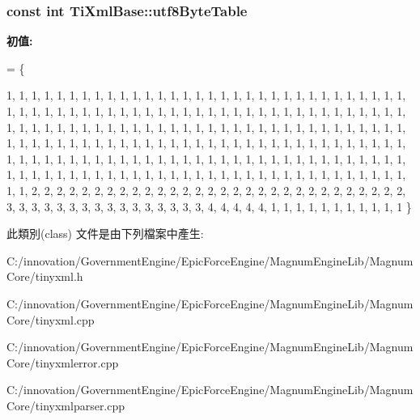 \subsubsection[{\texorpdfstring{utf8\+Byte\+Table}{utf8ByteTable}}]{\setlength{\rightskip}{0pt plus 5cm}const int Ti\+Xml\+Base\+::utf8\+Byte\+Table\hspace{0.3cm}{\ttfamily [static]}}\hypertarget{class_ti_xml_base_ac8c86058137bdb4b413c3eca58f2d467}{}\label{class_ti_xml_base_ac8c86058137bdb4b413c3eca58f2d467}
{\bfseries 初值\+:}
\begin{DoxyCode}
= 
\{
    
        1,  1,  1,  1,  1,  1,  1,  1,  1,  1,  1,  1,  1,  1,  1,  1,  
        1,  1,  1,  1,  1,  1,  1,  1,  1,  1,  1,  1,  1,  1,  1,  1,  
        1,  1,  1,  1,  1,  1,  1,  1,  1,  1,  1,  1,  1,  1,  1,  1,  
        1,  1,  1,  1,  1,  1,  1,  1,  1,  1,  1,  1,  1,  1,  1,  1,  
        1,  1,  1,  1,  1,  1,  1,  1,  1,  1,  1,  1,  1,  1,  1,  1,  
        1,  1,  1,  1,  1,  1,  1,  1,  1,  1,  1,  1,  1,  1,  1,  1,  
        1,  1,  1,  1,  1,  1,  1,  1,  1,  1,  1,  1,  1,  1,  1,  1,  
        1,  1,  1,  1,  1,  1,  1,  1,  1,  1,  1,  1,  1,  1,  1,  1,  
        1,  1,  1,  1,  1,  1,  1,  1,  1,  1,  1,  1,  1,  1,  1,  1,  
        1,  1,  1,  1,  1,  1,  1,  1,  1,  1,  1,  1,  1,  1,  1,  1,  
        1,  1,  1,  1,  1,  1,  1,  1,  1,  1,  1,  1,  1,  1,  1,  1,  
        1,  1,  1,  1,  1,  1,  1,  1,  1,  1,  1,  1,  1,  1,  1,  1,  
        1,  1,  2,  2,  2,  2,  2,  2,  2,  2,  2,  2,  2,  2,  2,  2,  
        2,  2,  2,  2,  2,  2,  2,  2,  2,  2,  2,  2,  2,  2,  2,  2,  
        3,  3,  3,  3,  3,  3,  3,  3,  3,  3,  3,  3,  3,  3,  3,  3,  
        4,  4,  4,  4,  4,  1,  1,  1,  1,  1,  1,  1,  1,  1,  1,  1   
\}
\end{DoxyCode}


此類別(class) 文件是由下列檔案中產生\+:\begin{DoxyCompactItemize}
\item 
C\+:/innovation/\+Government\+Engine/\+Epic\+Force\+Engine/\+Magnum\+Engine\+Lib/\+Magnum\+Core/tinyxml.\+h\item 
C\+:/innovation/\+Government\+Engine/\+Epic\+Force\+Engine/\+Magnum\+Engine\+Lib/\+Magnum\+Core/tinyxml.\+cpp\item 
C\+:/innovation/\+Government\+Engine/\+Epic\+Force\+Engine/\+Magnum\+Engine\+Lib/\+Magnum\+Core/tinyxmlerror.\+cpp\item 
C\+:/innovation/\+Government\+Engine/\+Epic\+Force\+Engine/\+Magnum\+Engine\+Lib/\+Magnum\+Core/tinyxmlparser.\+cpp\end{DoxyCompactItemize}
